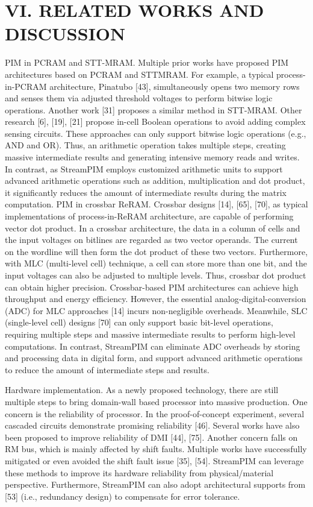 \documentclass[10pt]{article}
\begin{document}
\section*{VI. RELATED WORKS AND DISCUSSION}
PIM in PCRAM and STT-MRAM. Multiple prior works have proposed PIM architectures based on PCRAM and STTMRAM. For example, a typical process-in-PCRAM architecture, Pinatubo [43], simultaneously opens two memory rows and senses them via adjusted threshold voltages to perform bitwise logic operations. Another work [31] proposes a similar method in STT-MRAM. Other research [6], [19], [21] propose in-cell Boolean operations to avoid adding complex sensing circuits. These approaches can only support bitwise logic operations (e.g., AND and OR). Thus, an arithmetic operation takes multiple steps, creating massive intermediate results and generating intensive memory reads and writes. In contrast, as StreamPIM employs customized arithmetic units to support advanced arithmetic operations such as addition, multiplication and dot product, it significantly reduces the amount of intermediate results during the matrix computation. PIM in crossbar ReRAM. Crossbar designs [14], [65], [70], as typical implementations of process-in-ReRAM architecture, are capable of performing vector dot product. In a crossbar architecture, the data in a column of cells and the input voltages on bitlines are regarded as two vector operands. The current on the wordline will then form the dot product of these two vectors. Furthermore, with MLC (multi-level cell) technique, a cell can store more than one bit, and the input voltages can also be adjusted to multiple levels. Thus, crossbar dot product can obtain higher precision. Crossbar-based PIM architectures can achieve high throughput and energy efficiency. However, the essential analog-digital-conversion (ADC) for MLC approaches [14] incurs non-negligible overheads. Meanwhile, SLC (single-level cell) designs [70] can only support basic bit-level operations, requiring multiple steps and massive intermediate results to perform high-level computations. In contrast, StreamPIM can eliminate ADC overheads by storing and processing data in digital form, and support advanced arithmetic operations to reduce the amount of intermediate steps and results.

Hardware implementation. As a newly proposed technology, there are still multiple steps to bring domain-wall based processor into massive production. One concern is the reliability of processor. In the proof-of-concept experiment, several cascaded circuits demonstrate promising reliability [46]. Several works have also been proposed to improve reliability of DMI [44], [75]. Another concern falls on RM bus, which is mainly affected by shift faults. Multiple works have successfully mitigated or even avoided the shift fault issue [35], [54]. StreamPIM can leverage these methods to improve its hardware reliability from physical/material perspective. Furthermore, StreamPIM can also adopt architectural supports from [53] (i.e., redundancy design) to compensate for error tolerance.
\end{document}
